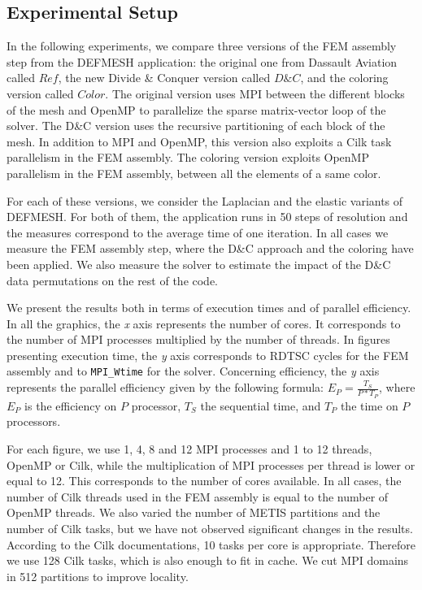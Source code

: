 \documentclass{IOS-Book-Article}
\begin{document}
\subsection{Experimental Setup}
In the following experiments, we compare three versions of the FEM assembly step from the DEFMESH application:
the original one from Dassault Aviation called $Ref$, the new Divide \& Conquer version called $D\&C$, and the coloring version called $Color$.
The original version uses MPI between the different blocks of the mesh and OpenMP to parallelize the sparse matrix-vector loop of the solver.
The D\&C version uses the recursive partitioning of each block of the mesh.
In addition to MPI and OpenMP, this version also exploits a Cilk task parallelism in the FEM assembly.
The coloring version exploits OpenMP parallelism in the FEM assembly, between all the elements of a same color.

For each of these versions, we consider the Laplacian and the elastic variants of DEFMESH.
For both of them, the application runs in 50 steps of resolution and the measures correspond to the average time of one iteration.
In all cases we measure the FEM assembly step, where the D\&C approach and the coloring have been applied.
We also measure the solver to estimate the impact of the D\&C data permutations on the rest of the code.

We present the results both in terms of execution times and of parallel efficiency.
In all the graphics, the \emph{x} axis represents the number of cores. It corresponds to the number of MPI processes multiplied by the number of threads.
In figures presenting execution time, the \emph{y} axis corresponds to RDTSC cycles for the FEM assembly and to \texttt{MPI\_Wtime} for the solver.
Concerning efficiency, the \emph{y} axis represents the parallel efficiency given by the following formula:
$E_{P} = \frac{T_{S}}{P*T_{P}}$, where $E_{P}$ is the efficiency on $P$ processor, $T_{S}$ the sequential time, and $T_{P}$ the time on $P$ processors.

For each figure, we use 1, 4, 8 and 12 MPI processes and 1 to 12 threads, OpenMP or Cilk, while the multiplication of MPI processes per thread is lower or equal to 12.
This corresponds to the number of cores available. In all cases, the number of Cilk threads used in the FEM assembly is equal to the number of OpenMP threads.
We also varied the number of METIS partitions and the number of Cilk tasks, but we have not observed significant changes in the results.
According to the Cilk documentations, 10 tasks per core is appropriate. Therefore we use 128 Cilk tasks, which is also enough to fit in cache.
We cut MPI domains in 512 partitions to improve locality.
\end{document}
